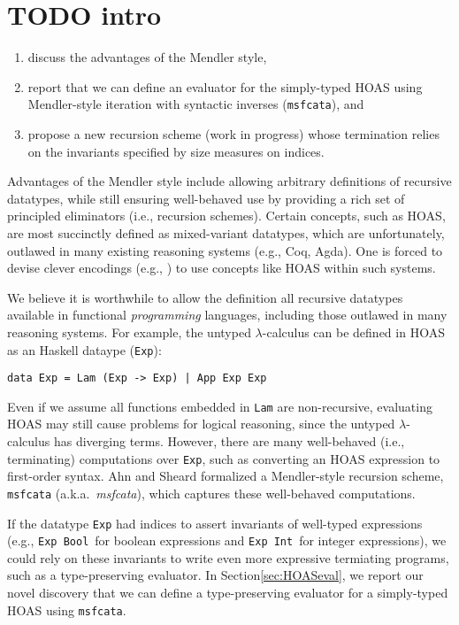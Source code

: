 \documentclass[a4paper,UKenglish]{lipics}
\newcommand{\eg}[0]{{e.g.}}
\newcommand{\ie}[0]{{i.e.}}
\newcommand{\aka}[0]{{a.k.a.}}
\begin{document}
\section{TODO intro}
\begin{enumerate}
	\item discuss the advantages of the Mendler style,
	\item report that we can define an evaluator for the simply-typed HOAS
		using Mendler-style iteration with syntactic inverses
		(\lstinline{msfcata}), and
	\item propose a new recursion scheme (work in progress) whose
		termination relies on the invariants specified by
		size measures on indices.
\end{enumerate}



Advantages of the Mendler style include allowing arbitrary definitions of
recursive datatypes, while still ensuring well-behaved use by providing
a rich set of principled eliminators (\ie, recursion schemes).
Certain concepts, such as HOAS, are most succinctly defined as
mixed-variant datatypes, which are unfortunately, outlawed in many existing
reasoning systems (\eg, Coq, Agda). One is forced to devise clever encodings
(\eg, \cite{PHOAS}) to use concepts like HOAS within such systems.

We believe it is worthwhile to allow the definition all recursive datatypes
available in functional \emph{programming} languages, including those outlawed
in many reasoning systems. For example, the untyped $\lambda$-calculus can be
defined in HOAS as an Haskell dataype (\lstinline{Exp}):
\begin{lstlisting}
data Exp = Lam (Exp -> Exp) | App Exp Exp
\end{lstlisting}
Even if we assume all functions embedded in \lstinline{Lam} are non-recursive,
evaluating HOAS may still cause problems for logical reasoning, since
the untyped $\lambda$-calculus has diverging terms. However, there are many
well-behaved (\ie, terminating) computations over \lstinline{Exp}, such as
converting an HOAS expression to first-order syntax.
Ahn and Sheard \cite{AhnShe11} formalized a Mendler-style recursion scheme,
\lstinline{msfcata}  (\aka\ \textit{msfcata}), which captures these
well-behaved computations.

If the datatype \lstinline{Exp} had indices to assert invariants of
well-typed expressions (\eg, \lstinline{Exp Bool}\, for boolean expressions
and \lstinline{Exp Int}\, for integer expressions), we could rely on these
invariants to write even more expressive termiating programs, such as
a type-preserving evaluator. In Section\;\ref{sec:HOASeval}, we report
our novel discovery that we can define a type-preserving evaluator for
a simply-typed HOAS using \lstinline{msfcata}.
\end{document}

